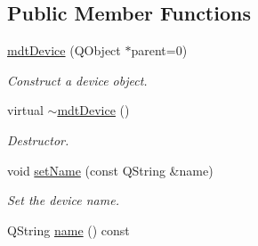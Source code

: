 \subsection*{Public Member Functions}
\begin{DoxyCompactItemize}
\item 
\hyperlink{classmdt_device_a6d501791e7243358cc61b144254b80db}{mdtDevice} (QObject $\ast$parent=0)
\begin{DoxyCompactList}\small\item\em Construct a device object. \end{DoxyCompactList}\item 
virtual \hyperlink{classmdt_device_ac2a9cfd6042f3f9d8da4e84f044d3f4a}{$\sim$mdtDevice} ()
\begin{DoxyCompactList}\small\item\em Destructor. \end{DoxyCompactList}\item 
\hypertarget{classmdt_device_a80186f1aa6fbdc13f1652de978c35518}{
void \hyperlink{classmdt_device_a80186f1aa6fbdc13f1652de978c35518}{setName} (const QString \&name)}
\label{classmdt_device_a80186f1aa6fbdc13f1652de978c35518}

\begin{DoxyCompactList}\small\item\em Set the device name. \end{DoxyCompactList}\item 
\hypertarget{classmdt_device_a7ad893c6885dbaef5a6cb980bfe627e0}{
QString \hyperlink{classmdt_device_a7ad893c6885dbaef5a6cb980bfe627e0}{name} () const }
\label{classmdt_device_a7ad893c6885dbaef5a6cb980bfe627e0}


\end{DoxyCompactItemize}
